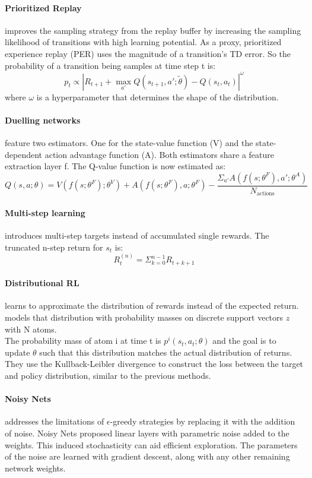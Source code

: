 \paragraph{Prioritized Replay} \cite{PER} improves the sampling strategy from the replay buffer by increasing the sampling likelihood of transitions with high learning potential.
As a proxy, prioritized experience replay (PER) uses the magnitude of a transition's TD error. So the probability of a transition being samples at time step t is:
$$p_t \propto | R_{t+1} + \max_{a'} Q(s_{t+1},a';\tilde\theta) - Q(s_t,a_t)|^\omega $$
where $\omega$ is a hyperparameter that determines the shape of the distribution.

\paragraph{Duelling networks} \cite{dueling} feature two estimators. One for the state-value function (V) and the state-dependent action advantage function (A).
Both estimators share a feature extraction layer f. The Q-value function is now estimated as:
$$Q(s,a;\theta) = V(f(s;\theta^F);\theta^V) + A(f(s;\theta^F), a;\theta^F) - \dfrac{\Sigma_{a'}A(f(s;\theta^F), a';\theta^A)}{N_\text{actions}} $$

\paragraph{Multi-step learning} introduces multi-step targets instead of accumulated single rewards.
The truncated n-step return for $s_t$ is:
$$R_t^{(n)}=\Sigma_{k=0}^{n-1} R_{t+k+1} $$

\paragraph{Distributional RL} learns to approximate the distribution of rewards instead of the expected return. \cite{distributionalRL} models that distribution with probability masses on discrete support vectors $z$ with N atoms.\\
The probability mass of atom i at time t is $p^i(s_t, a_t; \theta)$ and the goal is to update $\theta$ such that this distribution matches the actual distribution of returns.
They use the Kullback-Leibler divergence to construct the loss between the target and policy distribution, similar to the previous methods.

\paragraph{Noisy Nets} addresses the limitations of $\epsilon$-greedy strategies by replacing it with the addition of noise. Noisy Nets \cite{NoisyNets} proposed linear layers with parametric noise added to the weights.
This induced stochasticity can aid efficient exploration.
The parameters of the noise are learned with gradient descent, along with any other remaining network weights. 

